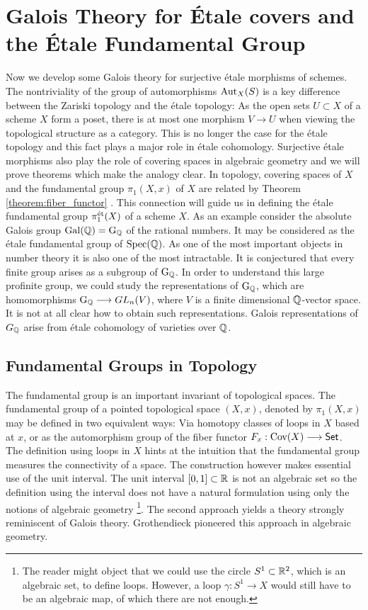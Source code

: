 \section{Galois Theory for \'Etale covers and the \'Etale Fundamental Group}
Now we develop some Galois theory for surjective \'etale morphisms of schemes. The nontriviality of the group of automorphisms $\operatorname{Aut}_X(S)$ is a key difference between the Zariski topology and the \'etale topology: As the open sets $U \subset X$ of a scheme $X$ form a poset, there is at most one morphism $V \to U$ when viewing the topological structure as a category. This is no longer the case for the \'etale topology and this fact plays a major role in \'etale cohomology. Surjective \'etale morphisms also play the role of covering spaces in algebraic geometry and we will prove theorems which make the analogy clear. In topology, covering spaces of $X$ and the fundamental group $\pi_1(X,x)$ of $X$ are related by Theorem \ref{theorem:fiber_functor} . This connection will guide us in defining the \'etale fundamental group $\pi^{\text{\'et}}_1(X)$ of a scheme $X$. As an example consider the absolute Galois group $\operatorname{Gal}(\mathbb{Q}) = \operatorname{G}_{\mathbb{Q}}$ of the rational numbers. It may be considered as the \'etale fundamental group of $\operatorname{Spec}(\mathbb{Q})$. As one of the most important objects in number theory it is also one of the most intractable. It is conjectured that every finite group arises as a subgroup of $\operatorname{G}_{\mathbb{Q}}$. In order to understand this large profinite group, we could study the representations of $\operatorname{G}_{\mathbb{Q}}$, which are homomorphisms $\operatorname{G}_{\mathbb{Q}} \longrightarrow GL_n(V)$, where $V$ is a finite dimensional $\mathbb{Q}$-vector space. It is not at all clear how to obtain such representations. Galois representations of $G_{\mathbb{Q}}$ arise from \'etale cohomology of varieties over $\mathbb{Q}$.

\subsection{Fundamental Groups in Topology}
The fundamental group is an important invariant of topological spaces. The fundamental group of a pointed topological space $(X,x)$, denoted by $\pi_1(X,x)$ may be defined in two equivalent ways: Via homotopy classes of loops in $X$ based at $x$, or as the automorphism group of the fiber functor $F_x: \text{Cov}(X) \longrightarrow \mathsf{Set}$. The definition using loops in $X$ hints at the intuition that the fundamental group measures the connectivity of a space. The construction however makes essential use of the unit interval. The unit interval $[0,1] \subset \mathbb{R}$ is not an algebraic set so the definition using the interval does not have a natural formulation using only the notions of algebraic geometry \footnote{The reader might object that we could use the circle $S^1 \subset \mathbb{R}^2$, which is an algebraic set, to define loops. However, a loop $\gamma \colon S^1 \to X$ would still have to be an algebraic map, of which there are not enough.}. The second approach yields a theory strongly reminiscent of Galois theory. Grothendieck pioneered this approach in algebraic geometry.

